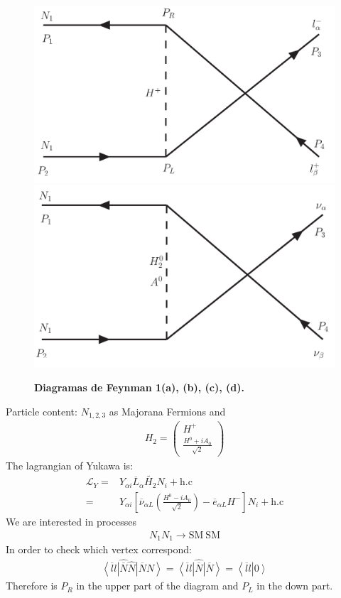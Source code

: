 \documentclass[12pt,letterpaper]{article}
\begin{document}
\begin{figure}
\begin{center}
    \includegraphics[scale=0.3]{3.png} 
    \includegraphics[scale=0.3]{4.png}
    \caption{\textbf{Diagramas de Feynman 1(a), (b), (c), (d).}}
    \label{fig:fgrd}
    \end{center}

\end{figure}

Particle content: $N_{1,2,3}$ as Majorana Fermions and
\begin{align}
  H_2=\begin{pmatrix}
    H^+\\
\frac{H^0+iA_0}{\sqrt{2}}
  \end{pmatrix}
\end{align}
The lagrangian of Yukawa is:
\begin{align}
  \mathcal{L}_Y=&Y_{\alpha i} \overline{L}_{\alpha} \widetilde{H_2} N_i+\text{h.c}\nonumber\\
=& Y_{\alpha i}\left[ \overline{\nu}_{\alpha L}\left( \frac{H^0-iA_0}{\sqrt{2}}\right) -\overline{e}_{\alpha L}H^-\right]N_i+\text{h.c}
\end{align}
We are interested in processes
\begin{align}
  N_1 N_1 \to \text{SM}\ \text{SM}
\end{align}
In order to check which vertex correspond:
\begin{align*}
  \left\langle \overline{l}l\right|\widehat{\overline{N}}\widehat{N}\left| \overline{N} N\right\rangle=
  \left\langle \overline{l}l\right|\widehat{\overline{N}}\left| \overline{N} \right\rangle=
  \left\langle \overline{l}l\right|\left. 0 \right\rangle
\end{align*}
Therefore is $P_R$ in the upper part of the diagram and $P_L$ in the down part.
\end{document}
